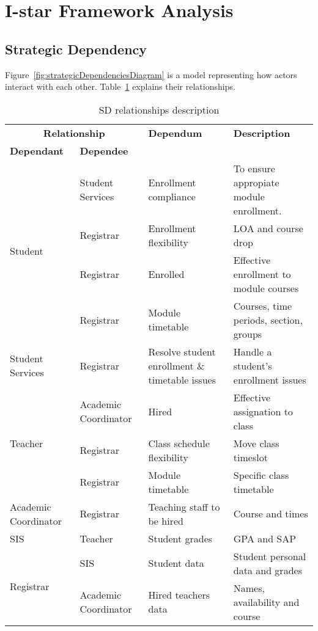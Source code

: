 \section{I-star Framework Analysis}
\label{sec:appendixIStarAnalysis}

\subsection*{Strategic Dependency}
Figure~\ref{fig:strategicDependenciesDiagram} is a model representing how actors interact with each other.
Table~\ref{tab:strategicDependencies} explains their relationships.
\begin{table}
\centering
\caption{SD relationships description} \label{tab:strategicDependencies}
	\begin{tabularx}{\linewidth}{@{} p{0.8in} p{1.2in} p{1.6in} X @{}}
	\toprule
	\multicolumn{2}{c}{\textbf{Relationship}} & \textbf{Dependum} & \textbf{Description} \\
	\cmidrule(lr){1-2}
	\textbf{Dependant} & \textbf{Dependee} & & \\
	\midrule
	\multirow{4}{*}{Student} & Student Services & Enrollment compliance & To ensure appropiate module enrollment. \\
	& Registrar & Enrollment flexibility & LOA and course drop \\
	& Registrar & Enrolled & Effective enrollment to module courses \\
	& Registrar & Module timetable & Courses, time periods, section, groups \\
	\hline
	Student Services & Registrar & Resolve student enrollment \& timetable issues & Handle a student's enrollment issues\\
	\hline
	\multirow{3}{*}{Teacher} & Academic Coordinator & Hired & Effective assignation to class \\
	& Registrar & Class schedule flexibility & Move class timeslot \\
	& Registrar & Module timetable & Specific class timetable \\
	\hline
	Academic Coordinator & Registrar & Teaching staff to be hired & Course and times \\
	\hline
	SIS & Teacher & Student grades & GPA and SAP\\
	\hline
	\multirow{2}{*}{Registrar} & SIS & Student data & Student personal data and grades\\
	& Academic Coordinator & Hired teachers data & Names, availability and course\\
	\bottomrule
	\end{tabularx}
\end{table}

